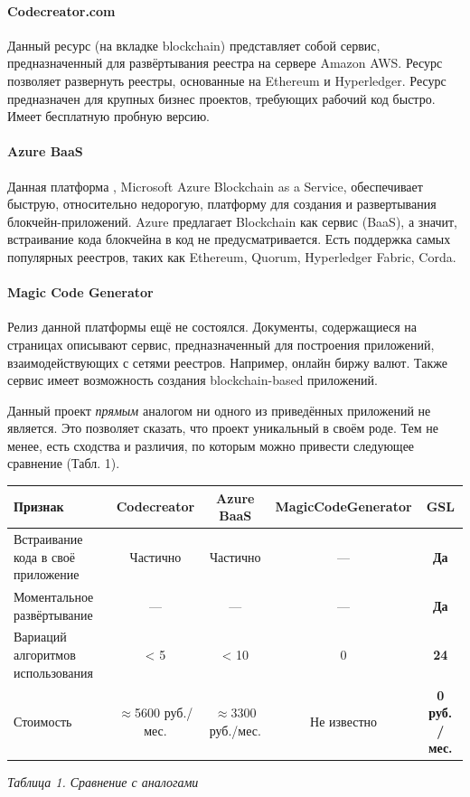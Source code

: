\paragraph{Codecreator.com}
Данный ресурс \cite{CodeCreator} (на вкладке blockchain) представляет собой
сервис, предназначенный для развёртывания реестра на сервере Amazon AWS. Ресурс
позволяет развернуть реестры, основанные на Ethereum и Hyperledger. Ресурс
предназначен для крупных бизнес проектов, требующих рабочий код быстро. Имеет
бесплатную пробную версию.

\paragraph{Azure BaaS}
Данная платформа \cite{MicrosoftAzure}, Microsoft Azure Blockchain as a
Service, обеспечивает быструю, относительно недорогую, платформу для создания и
развертывания блокчейн-приложений. Azure предлагает Blockchain как сервис
(BaaS), а значит, встраивание кода блокчейна в код не предусматривается. Есть
поддержка самых популярных реестров, таких как Ethereum, Quorum, Hyperledger
Fabric, Corda.

\paragraph{Magic Code Generator}
Релиз данной платформы \cite{mcg} ещё не состоялся.  Документы, содержащиеся на
страницах описывают сервис, предназначенный для построения приложений,
взаимодействующих с сетями реестров. Например, онлайн биржу валют. Также
сервис имеет возможность создания blockchain-based приложений.


Данный проект \emph{прямым} аналогом ни одного из приведённых приложений не
является. Это позволяет сказать, что проект уникальный в своём роде. Тем не
менее, есть сходства и различия, по которым можно привести следующее сравнение
(Табл. 1).

\begin{center}
    \begin{tabular}{ | p{4cm} | c | c | c | c | }
    \hline
    \hline
      Признак & Codecreator & Azure BaaS & MagicCodeGenerator\footnotemark & \textbf{GSL} \\ \hline
      Встраивание кода в своё приложение & Частично & Частично & --- & \textbf{Да} \\ \hline
      Моментальное развёртывание & --- & --- & --- & \textbf{Да} \\ \hline
      Вариаций алгоритмов использования & < 5 & < 10 & 0 & \textbf{24} \\ \hline
      Стоимость & $\approx$5600 руб./мес. & $\approx$3300 руб./мес. & Не известно & \textbf{0 руб. / мес.} \\ \hline
    \hline
  \end{tabular}

    \vspace{-5cm} \hfill \emph{Таблица 1. Сравнение с аналогами} \vspace{4.1cm}
\end{center}

